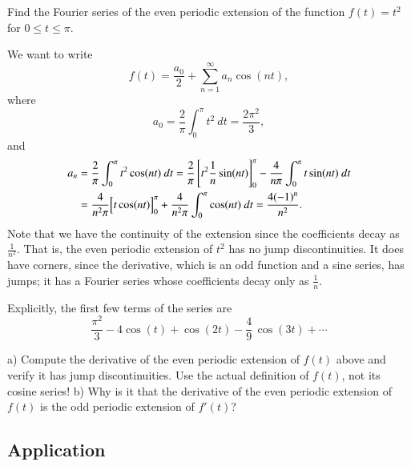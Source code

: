 \documentclass[12pt]{book}
\begin{document}

\begin{example}
Find the Fourier series of the even periodic extension of 
the function $f(t) = t^2$ for $0 \leq t \leq \pi$.

We want to write
\begin{equation*}
f(t) = \frac{a_0}{2} + \sum_{n=1}^\infty a_n \cos (n t) ,
\end{equation*}
where
\begin{equation*}
a_0 = \frac{2}{\pi}
\int_0^\pi t^2 ~ dt = \frac{2 \pi^2}{3} ,
\end{equation*}
and
\begin{equation*}
\begin{split}
a_n & = \frac{2}{\pi}
\int_0^\pi t^2 \cos (n t) ~ dt
= \frac{2}{\pi} \left[ t^2 \frac{1}{n} \sin (nt) \right]_0^\pi -
\frac{4}{n\pi}
\int_0^\pi t \sin (n t) ~ dt \\
& = 
\frac{4}{n^2\pi}
\Bigl[ t \cos (n t) \Bigr]_0^\pi
+
\frac{4}{n^2\pi}
\int_0^\pi \cos (n t) ~ dt
= 
\frac{4{(-1)}^n}{n^2} .
\end{split}
\end{equation*}
Note that we have  the continuity of the extension since the
coefficients decay as $\frac{1}{n^2}$.  That is, the even periodic extension
of $t^2$ has no jump discontinuities.  It does have corners, since
the derivative, which is an odd function and a sine series, has jumps; it has
a Fourier series whose coefficients decay only as $\frac{1}{n}$.

Explicitly, the first few terms of the series are
\begin{equation*}
\frac{\pi^2}{3} - 4 \cos (t) + \cos (2t) - \frac{4}{9}\, \cos (3t) + \cdots
\end{equation*}
\end{example}

\begin{exercise}
a) Compute the derivative of the even periodic extension of $f(t)$ above and verify it
has jump discontinuities.  Use the actual definition of $f(t)$, not its cosine
series!  b) Why is it that the derivative of the even periodic extension of $f(t)$ is the
odd periodic extension of $f'(t)$?
\end{exercise}

\subsection{Application}
\end{document}
